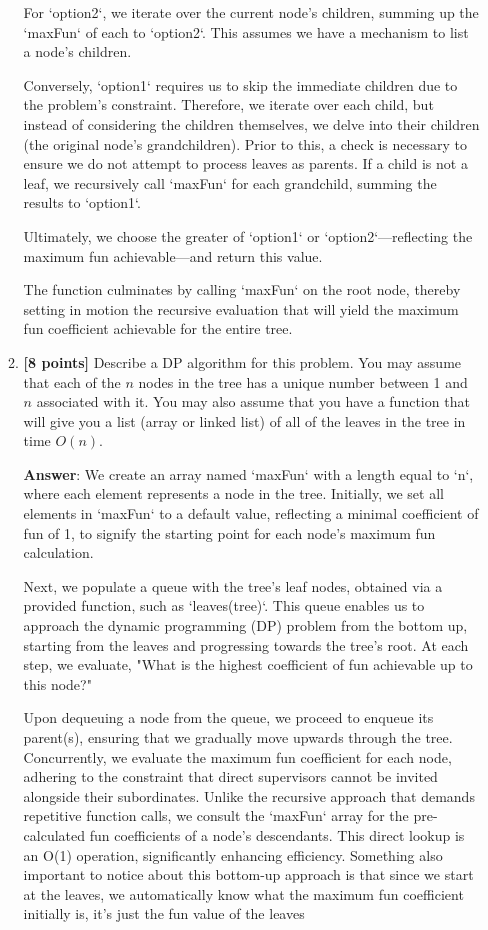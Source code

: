 \documentclass[11pt]{article}
\begin{document}
\begin{enumerate}
\begin{enumerate}
For `option2`, we iterate over the current node's children, summing up the `maxFun` of each to `option2`. This assumes we have a mechanism to list a node's children.

Conversely, `option1` requires us to skip the immediate children due to the problem's constraint. Therefore, we iterate over each child, but instead of considering the children themselves, we delve into their children (the original node's grandchildren). Prior to this, a check is necessary to ensure we do not attempt to process leaves as parents. If a child is not a leaf, we recursively call `maxFun` for each grandchild, summing the results to `option1`.

Ultimately, we choose the greater of `option1` or `option2`—reflecting the maximum fun achievable—and return this value.

The function culminates by calling `maxFun` on the root node, thereby setting in motion the recursive evaluation that will yield the maximum fun coefficient achievable for the entire tree.
\item \textbf{[8 points]} Describe a DP algorithm for this problem. You may assume that each of the $n$ nodes in the tree has a unique number between 1 and $n$ associated with it. You may also assume that you have a function that will give you a list (array or linked list) of all of the leaves in the tree in time $O(n)$.

\textbf{Answer}:
We create an array named `maxFun` with a length equal to `n`, where each element represents a node in the tree. Initially, we set all elements in `maxFun` to a default value, reflecting a minimal coefficient of fun of 1, to signify the starting point for each node's maximum fun calculation.

Next, we populate a queue with the tree's leaf nodes, obtained via a provided function, such as `leaves(tree)`. This queue enables us to approach the dynamic programming (DP) problem from the bottom up, starting from the leaves and progressing towards the tree's root. At each step, we evaluate, "What is the highest coefficient of fun achievable up to this node?"

Upon dequeuing a node from the queue, we proceed to enqueue its parent(s), ensuring that we gradually move upwards through the tree. Concurrently, we evaluate the maximum fun coefficient for each node, adhering to the constraint that direct supervisors cannot be invited alongside their subordinates. Unlike the recursive approach that demands repetitive function calls, we consult the `maxFun` array for the pre-calculated fun coefficients of a node's descendants. This direct lookup is an O(1) operation, significantly enhancing efficiency. Something also important to notice about this bottom-up approach is that since we start at the leaves, we automatically know what the maximum fun coefficient initially is, it's just the fun value of the leaves


\end{enumerate}
\end{enumerate}
\end{document}
